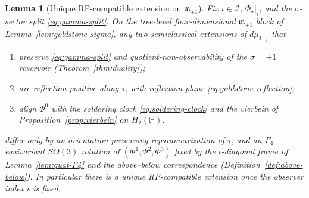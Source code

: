\documentclass[11pt]{article}
\theoremstyle{plain}
\newtheorem{lemma}[theorem]{Lemma}
\theoremstyle{definition}
\theoremstyle{remark}
\numberwithin{equation}{section}
\newcommand{\Quat}{\mathbb{H}}
\newcommand{\orderparam}{\Phi}
\begin{document}
\begin{lemma}[Unique RP-compatible extension on $\mathfrak{m}_{+1}$]
\label{lem:goldstone-rp-unique}
Fix $\iota\in\mathcal{I}$, $\orderparam_\star|_\iota$, and the
$\sigma$-sector split \eqref{eq:gamma-split}. On the tree-level
four-dimensional $\mathfrak{m}_{+1}$ block of
Lemma~\ref{lem:goldstone-sigma}, any two semiclassical extensions of
$d\mu_{\Gamma_{+1}}$ that
\begin{enumerate}[label=(\roman*),leftmargin=*]
  \item preserve \eqref{eq:gamma-split} and quotient-non-observability of
    the $\sigma=+1$ reservoir (Theorem~\ref{thm:duality});
  \item are reflection-positive along $\tau_\iota$ with reflection plane
    \eqref{eq:goldstone-reflection};
  \item align $\orderparam^0$ with the soldering clock
    \eqref{eq:soldering-clock} and the vierbein of
    Proposition~\ref{prop:vierbein} on $H_2(\Quat)$.
\end{enumerate}
differ only by an orientation-preserving reparametrization of
$\tau_\iota$ and an $F_4$-equivariant $SO(3)$ rotation of
$(\orderparam^1,\orderparam^2,\orderparam^3)$ fixed by the
$\iota$-diagonal frame of Lemma~\ref{lem:quat-F4} and the above--below
correspondence (Definition~\ref{def:above-below}). In particular there is a
\emph{unique} RP-compatible extension once the observer index $\iota$ is fixed.
\end{lemma}
\end{document}
